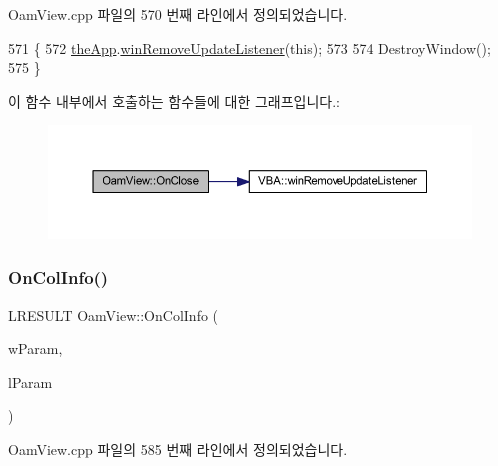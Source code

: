 Oam\+View.\+cpp 파일의 570 번째 라인에서 정의되었습니다.


\begin{DoxyCode}
571 \{
572   \mbox{\hyperlink{_v_b_a_8cpp_a8095a9d06b37a7efe3723f3218ad8fb3}{theApp}}.\mbox{\hyperlink{class_v_b_a_a2d31a0656df2230310aa8dc9e3a735d3}{winRemoveUpdateListener}}(\textcolor{keyword}{this});
573   
574   DestroyWindow();
575 \}
\end{DoxyCode}
이 함수 내부에서 호출하는 함수들에 대한 그래프입니다.\+:
\nopagebreak
\begin{figure}[H]
\begin{center}
\leavevmode
\includegraphics[width=350pt]{class_oam_view_aa09ba3520dcfe8357764cbbd170e7c9c_cgraph}
\end{center}
\end{figure}
\mbox{\label{class_oam_view_a5b910cf923020f054165c52c01d0181f}} 
\subsubsection{\texorpdfstring{On\+Col\+Info()}{OnColInfo()}}
{\footnotesize\ttfamily L\+R\+E\+S\+U\+LT Oam\+View\+::\+On\+Col\+Info (\begin{DoxyParamCaption}\item[{W\+P\+A\+R\+AM}]{w\+Param,  }\item[{L\+P\+A\+R\+AM}]{l\+Param }\end{DoxyParamCaption})}



Oam\+View.\+cpp 파일의 585 번째 라인에서 정의되었습니다.


